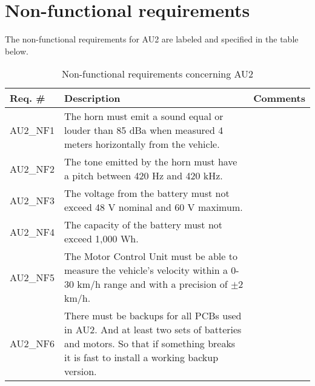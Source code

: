 \section{Non-functional requirements}
The non-functional requirements for AU2 are labeled and specified in the table below.

\begin{table}[h!]
	\centering
	\label{my-label}
	\begin{tabular}{|p{2 cm}|p{7 cm}|p{4 cm}|}
		\hline
		\textbf{Req. \#} & \textbf{Description} & \textbf{Comments} \\\hline
		AU2\_NF1	& The horn must emit a sound equal or louder than 85 dBa when measured 4 meters horizontally from the vehicle. &	\\\hline
		AU2\_NF2	& The tone emitted by the horn must have a pitch between 420 Hz and 420 kHz. &	\\\hline
		AU2\_NF3	& The voltage from the battery must not exceed 48 V nominal and 60 V maximum. &	\\\hline
		AU2\_NF4	& The capacity of the battery must not exceed 1,000 Wh. &	\\\hline
		AU2\_NF5	& The Motor Control Unit must be able to measure the vehicle's velocity within a 0-30 km/h range and with a precision of $\pm$2 km/h. &	\\\hline
		AU2\_NF6	& There must be backups for all PCBs used in AU2. And at least two sets of batteries and motors. So that if something breaks it is fast to install a working backup version. &	\\\hline
	\end{tabular}
	\caption{Non-functional requirements concerning AU2}
\end{table}

